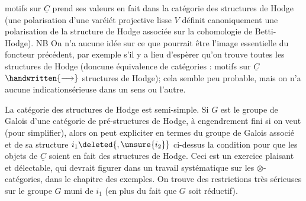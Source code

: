 %
motifs sur $\underline{C}$ prend ses valeurs en fait dans la catégorie des structures de Hodge (une polarisation d'une varéiét projective lisse $V$ définit canoniquement une polarisation de la structure de Hodge associée sur la cohomologie de Betti-Hodge). NB On n'a aucune idée sur ce que pourrait être l'image essentielle du foncteur précédent, par exemple s'il y a lieu d'espèrer qu'on trouve toutes les structures de Hodge (doncune équivalence de catégories : motifs sur $\underline{C}$ $\handwritten{\longrightarrow}$ structures de Hodge); cela semble peu probable, mais on n'a aucune indicationsérieuse dans un sens ou l'autre.

La catégorie des  structures de Hodge est semi-simple.  Si $G$ est le groupe de Galois d'une catégorie  de pré-structures de Hodge, à engendrement fini si on veut (pour simplifier), alors on peut expliciter en termes du groupe de Galois associé et de sa structure $i_1\deleted{,\unsure{i_2}}$ ci-dessus la condition  pour que les objets de $\underline{C}$ soient en fait des structures de Hodge. Ceci est un exercice plaisant et délectable, qui devrait figurer dans un travail systématique sur les $\otimes$-catégories, dans le chapitre des exemples. On trouve des restrictions très sérieuses sur le groupe $G$  muni de $i_1$ (en plus du fait que $G$ soit réductif).


